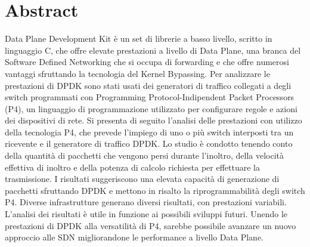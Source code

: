 \chapter*{Abstract}


Data Plane Development Kit è un set di librerie a basso livello, scritto in linguaggio C, che offre elevate prestazioni a livello di Data Plane, una branca del Software Defined Networking che si occupa di forwarding e che offre numerosi vantaggi sfruttando la tecnologia del Kernel Bypassing. 
Per analizzare le prestazioni di DPDK sono stati usati dei generatori di traffico collegati a degli switch programmati con Programming Protocol-Indipendent Packet Processors (P4), un linguaggio di programmazione utilizzato per configurare regole e azioni dei dispositivi di rete.
Si presenta di seguito l'analisi delle prestazioni con utilizzo della tecnologia P4, che prevede l'impiego di uno o più switch interposti tra un ricevente e il generatore di traffico DPDK. Lo studio è condotto tenendo conto della quantità di pacchetti che vengono persi durante l'inoltro, della velocità effettiva di inoltro e della potenza di calcolo richiesta per effettuare la trasmissione.
I risultati suggeriscono una elevata capacità di generazione di pacchetti sfruttando DPDK e mettono in risalto la riprogrammabilità degli switch P4.
Diverse infrastrutture generano diversi risultati, con prestazioni variabili.
L'analisi dei risultati è utile in funzione ai possibili sviluppi futuri. Unendo le prestazioni di DPDK alla versatilità di P4, sarebbe possibile avanzare un nuovo approccio alle SDN migliorandone le performance a livello Data Plane.
\newpage